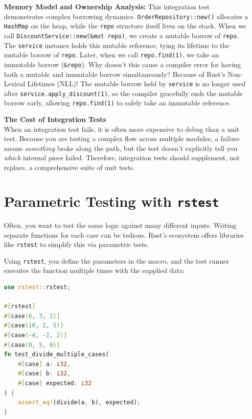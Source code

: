 \textbf{Memory Model and Ownership Analysis:} This integration test demonstrates complex borrowing dynamics. \texttt{OrderRepository::new()} allocates a \texttt{HashMap} on the heap, while the \texttt{repo} structure itself lives on the stack. When we call \texttt{DiscountService::new(\&mut repo)}, we create a mutable borrow of \texttt{repo}. The \texttt{service} instance holds this mutable reference, tying its lifetime to the mutable borrow of \texttt{repo}. Later, when we call \texttt{repo.find(1)}, we take an immutable borrow (\texttt{\&repo}). Why doesn't this cause a compiler error for having both a mutable and immutable borrow simultaneously? Because of Rust's Non-Lexical Lifetimes (NLL)! The mutable borrow held by \texttt{service} is no longer used after \texttt{service.apply\_discount(1)}, so the compiler gracefully ends the mutable borrow early, allowing \texttt{repo.find(1)} to safely take an immutable reference.

\begin{warningbox}
\textbf{The Cost of Integration Tests}\\
When an integration test fails, it is often more expensive to debug than a unit test. Because you are testing a complex flow across multiple modules, a failure means \textit{something} broke along the path, but the test doesn't explicitly tell you \textit{which} internal piece failed. Therefore, integration tests should supplement, not replace, a comprehensive suite of unit tests.
\end{warningbox}

\section{Parametric Testing with \texttt{rstest}}

Often, you want to test the same logic against many different inputs. Writing separate functions for each case can be tedious. Rust's ecosystem offers libraries like \texttt{rstest} to simplify this via parametric tests.

Using \texttt{rstest}, you define the parameters in the macro, and the test runner executes the function multiple times with the supplied data:

\begin{lstlisting}[language=Rust]
use rstest::rstest;

#[rstest]
#[case(6, 3, 2)]
#[case(10, 2, 5)]
#[case(-4, -2, 2)]
#[case(0, 5, 0)]
fn test_divide_multiple_cases(
    #[case] a: i32, 
    #[case] b: i32, 
    #[case] expected: i32
) {
    assert_eq!(divide(a, b), expected);
}
\end{lstlisting}

